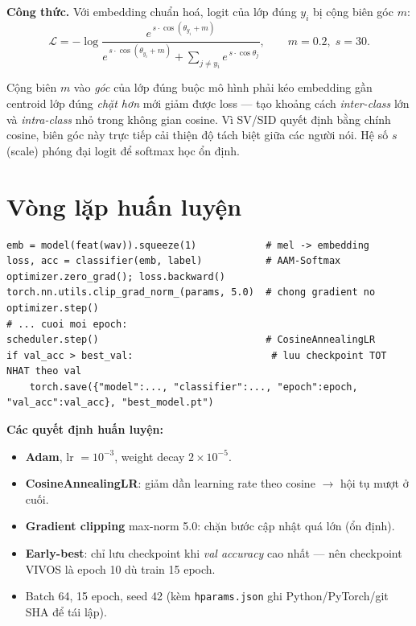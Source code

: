 \documentclass[12pt,a4paper]{article}
\begin{document}
\textbf{Công thức.} Với embedding chuẩn hoá, logit của lớp đúng $y_i$ bị cộng biên
góc $m$:
\[
\mathcal{L}=-\log\frac{e^{\,s\cdot\cos(\theta_{y_i}+m)}}
{e^{\,s\cdot\cos(\theta_{y_i}+m)}+\sum_{j\ne y_i} e^{\,s\cdot\cos\theta_j}},
\qquad m=0.2,\; s=30.
\]

\begin{ycbox}
Cộng biên $m$ vào \emph{góc} của lớp đúng buộc mô hình phải kéo embedding gần
centroid lớp đúng \emph{chặt hơn} mới giảm được loss --- tạo khoảng cách
\emph{inter-class} lớn và \emph{intra-class} nhỏ trong không gian cosine. Vì SV/SID
quyết định bằng chính cosine, biên góc này trực tiếp cải thiện độ tách biệt giữa
các người nói. Hệ số $s$ (scale) phóng đại logit để softmax học ổn định.
\end{ycbox}

\section{Vòng lặp huấn luyện}
\begin{lstlisting}
emb = model(feat(wav)).squeeze(1)            # mel -> embedding
loss, acc = classifier(emb, label)           # AAM-Softmax
optimizer.zero_grad(); loss.backward()
torch.nn.utils.clip_grad_norm_(params, 5.0)  # chong gradient no
optimizer.step()
# ... cuoi moi epoch:
scheduler.step()                             # CosineAnnealingLR
if val_acc > best_val:                        # luu checkpoint TOT NHAT theo val
    torch.save({"model":..., "classifier":..., "epoch":epoch, "val_acc":val_acc}, "best_model.pt")
\end{lstlisting}

\textbf{Các quyết định huấn luyện:}
\begin{itemize}
  \item \textbf{Adam}, lr $=10^{-3}$, weight decay $2\times10^{-5}$.
  \item \textbf{CosineAnnealingLR}: giảm dần learning rate theo cosine $\to$ hội tụ
  mượt ở cuối.
  \item \textbf{Gradient clipping} max-norm 5.0: chặn bước cập nhật quá lớn (ổn định).
  \item \textbf{Early-best}: chỉ lưu checkpoint khi \emph{val accuracy} cao nhất
  --- nên checkpoint VIVOS là epoch 10 dù train 15 epoch.
  \item Batch 64, 15 epoch, seed 42 (kèm \texttt{hparams.json} ghi Python/PyTorch/git SHA
  để tái lập).
\end{itemize}
\end{document}
